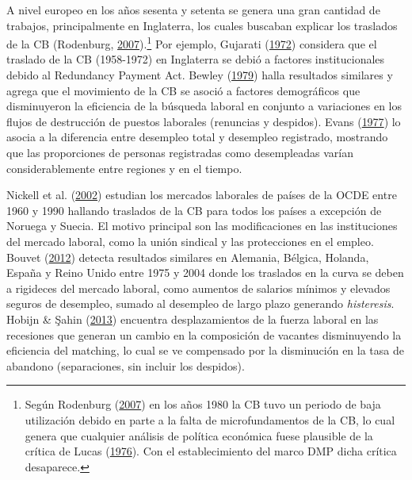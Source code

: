 \documentclass[12pt,oneside]{reedthesis}
\begin{document}
A nivel europeo en los años sesenta y setenta se genera una gran cantidad de trabajos, principalmente en Inglaterra, los cuales buscaban explicar los traslados de la CB (Rodenburg, \protect\hyperlink{ref-Rodenburg2007}{2007}).\footnote{Según Rodenburg (\protect\hyperlink{ref-Rodenburg2007}{2007}) en los años 1980 la CB tuvo un periodo de baja utilización debido en parte a la falta de microfundamentos de la CB, lo cual genera que cualquier análisis de política económica fuese plausible de la crítica de Lucas (\protect\hyperlink{ref-Lucas1976}{1976}). Con el establecimiento del marco DMP dicha crítica desaparece.} Por ejemplo, Gujarati (\protect\hyperlink{ref-Gujarati1972}{1972}) considera que el traslado de la CB (1958-1972) en Inglaterra se debió a factores institucionales debido al Redundancy Payment Act. Bewley (\protect\hyperlink{ref-Bewley1979}{1979}) halla resultados similares y agrega que el movimiento de la CB se asoció a factores demográficos que disminuyeron la eficiencia de la búsqueda laboral en conjunto a variaciones en los flujos de destrucción de puestos laborales (renuncias y despidos). Evans (\protect\hyperlink{ref-Evans1977}{1977}) lo asocia a la diferencia entre desempleo total y desempleo registrado, mostrando que las proporciones de personas registradas como desempleadas varían considerablemente entre regiones y en el tiempo.

Nickell et al. (\protect\hyperlink{ref-Nickell2002}{2002}) estudian los mercados laborales de países de la OCDE entre 1960 y 1990 hallando traslados de la CB para todos los países a excepción de Noruega y Suecia. El motivo principal son las modificaciones en las instituciones del mercado laboral, como la unión sindical y las protecciones en el empleo. Bouvet (\protect\hyperlink{ref-Bouvet2012}{2012}) detecta resultados similares en Alemania, Bélgica, Holanda, España y Reino Unido entre 1975 y 2004 donde los traslados en la curva se deben a rigideces del mercado laboral, como aumentos de salarios mínimos y elevados seguros de desempleo, sumado al desempleo de largo plazo generando \emph{histeresis}. Hobijn \& Şahin (\protect\hyperlink{ref-Hobijn2013}{2013}) encuentra desplazamientos de la fuerza laboral en las recesiones que generan un cambio en la composición de vacantes disminuyendo la eficiencia del matching, lo cual se ve compensado por la disminución en la tasa de abandono (separaciones, sin incluir los despidos).
\end{document}
